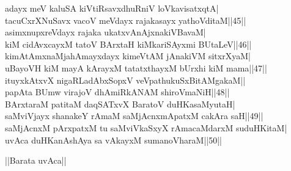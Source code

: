 \documentclass{article}
\begin{document}
adayx meV kaluSA kiVtiRsavxdhuRniV loVkavisatxqtA|\\
tacuCxrXNuSavx vacoV meVdayx rajakasayx yathoVditaM||45||\\
asimxnupxreVdayx rajaka ukatxvAnAjxnakiVBavaM|\\
kiM cidAvxcayxM tatoV BArxtaH kiMkariSAyxmi BUtaLeV||46||\\
kimAtAmxnaMja{hA}mayxdayx kimeVtAM jAnakiVM sitxrXyaM|\\
uBayoVH kiM mayA kArayxM tatatxthayxM bUrxhi kiM mama||47||\\
ituyxkAtxvX nigaRLadAbxSopxV veVpathukuSxBitAMgakaM||\\
papAta BUmw virajoV dhAmiRkANAM shiroVmaNiH||48||\\
BArxtaraM patitaM daqSATxvX BaratoV duHKasaMyutaH|\\
saMviVjayx shanakeY rAmaM saMjAcnxmApatxM cakAra saH||49||\\
saMjAcnxM pArxpatxM tu saMviVkaSxyX rAmacaMdarxM suduHKitaM|\\
uvAca duHKanAshAya sa vAkayxM sumanoVharaM||50||\\

\begin{center}
||Barata uvAca||
\end{center}
\end{document}
